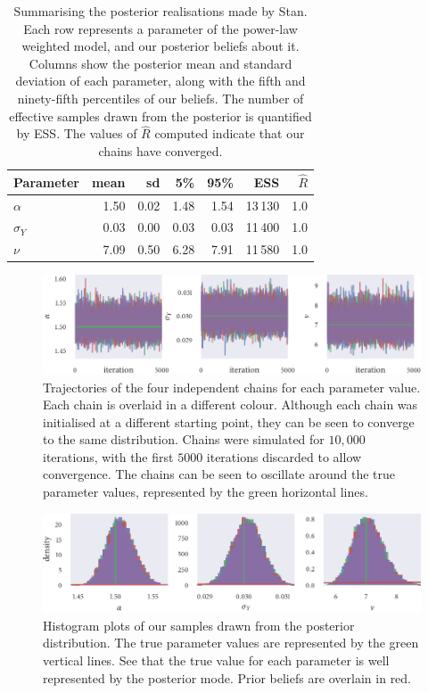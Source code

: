\begin{table}[p]
  \begin{tabular}{@{}lrrrrrr@{}}
    \toprule
    Parameter    & mean & sd   & 5\%  & 95\% & ESS     & $\widehat{R}$ \\
    \midrule
    $\alpha$     & 1.50 & 0.02 & 1.48 & 1.54 & 13\,130 & 1.0           \\
    $\sigma_{Y}$ & 0.03 & 0.00 & 0.03 & 0.03 & 11\,400 & 1.0           \\
    $\nu$        & 7.09 & 0.50 & 6.28 & 7.91 & 11\,580 & 1.0           \\
    \bottomrule
  \end{tabular}
  \caption{Summarising the posterior realisations made by Stan. Each row represents a
    parameter of the power-law weighted model, and our posterior beliefs about it.
    Columns show the posterior mean and standard deviation of each parameter, along with
    the fifth and ninety-fifth percentiles of our beliefs. The number of effective
    samples drawn from the posterior is quantified by ESS. The values of
    $\widehat{R}$ computed indicate that our chains have converged.}
  \label{tab:power_sim_study_summary}
\end{table}
\begin{figure}[p]
  \includegraphics{power_trace.pdf}
  \caption{Trajectories of the four independent chains for each parameter
    value. Each chain is overlaid in a different colour. Although each chain
    was initialised at a different starting point, they can be seen to
    converge to the same distribution. Chains were simulated for $10,000$
    iterations, with the first $5000$ iterations discarded to allow convergence.
    The chains can be seen to oscillate around the true parameter values,
    represented by the green horizontal lines.}
  \label{fig:power_sim_study_chains}
\end{figure}
\begin{figure}[p]
  \includegraphics{power_hist.pdf}
  \caption{Histogram plots of our samples drawn from the posterior distribution. The true
    parameter values are represented by the green vertical lines. See that the true value
    for each parameter is well represented by the posterior mode. Prior beliefs are overlain
    in red.}
  \label{fig:power_sim_study_hists}
\end{figure}

